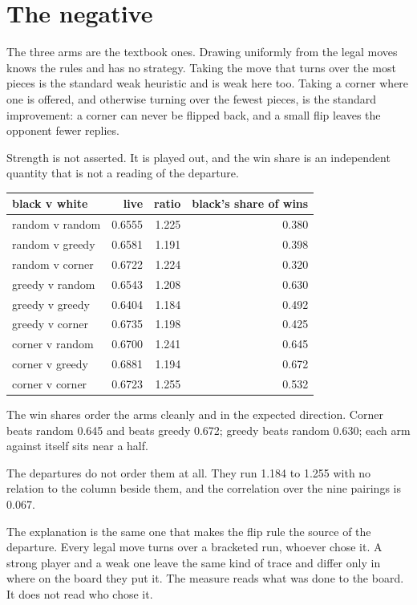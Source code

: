 \section{The negative}

The three arms are the textbook ones. Drawing uniformly from the legal moves knows the rules and
has no strategy. Taking the move that turns over the most pieces is the standard weak heuristic and is
weak here too. Taking a corner where one is offered, and otherwise turning over the fewest pieces, is
the standard improvement: a corner can never be flipped back, and a small flip leaves the opponent
fewer replies.

Strength is not asserted. It is played out, and the win share is an independent quantity that is not
a reading of the departure.

\begin{center}
\begin{tabular}{@{}lrrr@{}}
\toprule
black v white & live & ratio & black's share of wins \\
\midrule
random v random & 0.6555 & 1.225 & 0.380 \\
random v greedy & 0.6581 & 1.191 & 0.398 \\
random v corner & 0.6722 & 1.224 & 0.320 \\
greedy v random & 0.6543 & 1.208 & 0.630 \\
greedy v greedy & 0.6404 & 1.184 & 0.492 \\
greedy v corner & 0.6735 & 1.198 & 0.425 \\
corner v random & 0.6700 & 1.241 & 0.645 \\
corner v greedy & 0.6881 & 1.194 & 0.672 \\
corner v corner & 0.6723 & 1.255 & 0.532 \\
\bottomrule
\end{tabular}
\end{center}

The win shares order the arms cleanly and in the expected direction. Corner beats random 0.645 and
beats greedy 0.672; greedy beats random 0.630; each arm against itself sits near a half.

The departures do not order them at all. They run 1.184 to 1.255 with no relation to the column
beside them, and the correlation over the nine pairings is 0.067.

The explanation is the same one that makes the flip rule the source of the departure. Every legal
move turns over a bracketed run, whoever chose it. A strong player and a weak one leave the same kind
of trace and differ only in where on the board they put it. The measure reads what was done to
the board. It does not read who chose it.

